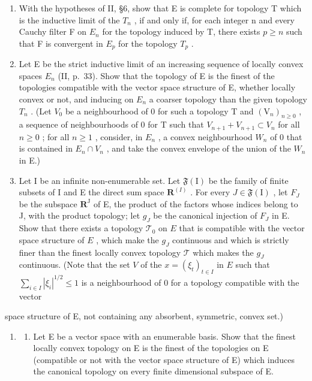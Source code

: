 \begin{enumerate}
\def\labelenumi{\arabic{enumi})}
\setcounter{enumi}{12}
\item
  With the hypotheses of II, §6, show that E is complete for topology T which is the inductive limit of the \(T_{n}\) , if and only if, for each integer n and every Cauchy filter F on \(E_{n}\) for the topology induced by T, there exists \(p \geqslant n\) such that F is convergent in \(E_{p}\) for the topology \(T_{p}\) .
\item
  Let E be the strict inductive limit of an increasing sequence of locally convex spaces \(E_{n}\) (II, p.~33). Show that the topology of E is the finest of the topologies compatible with the vector space structure of E, whether locally convex or not, and inducing on \(E_{n}\) a coarser topology than the given topology \(T_{n}\) . (Let \(V_{0}\) be a neighbourhood of 0 for such a topology T and \((\mathrm{V}_{n})_{n\geqslant0}\) , a sequence of neighbourhoods of 0 for T such that \(V_{n+1} + V_{n+1} \subset V_{n}\) for all \(n \geqslant 0\) ; for all \(n \geqslant 1\) , consider, in \(E_{n}\) , a convex neighbourhood \(W_{n}\) of 0 that is contained in \(E_{n} \cap V_{n}\) , and take the convex envelope of the union of the \(W_{n}\) in E.)
\item
  Let I be an infinite non-enumerable set. Let \(\mathfrak{F}(\mathrm{I})\) be the family of finite subsets of I and E the direct sum space \(\mathbf{R}^{(I)}\) . For every \(J \in \mathfrak{F}(\mathrm{I})\) , let \(F_{J}\) be the subspace \(\mathbf{R}^{\mathrm{J}}\) of E, the product of the factors whose indices belong to J, with the product topology; let \(g_{J}\) be the canonical injection of \(F_{J}\) in E. Show that there exists a topology \(\mathcal{T}_0\) on \(E\) that is compatible with the vector space structure of \(E\) , which make the \(g_{J}\) continuous and which is strictly finer than the finest locally convex topology \(\mathcal{T}\) which makes the \(g_{J}\) continuous. (Note that the set \(V\) of the \(x = (\xi_{t})_{t\in I}\) in \(E\) such that \(\sum_{i\in I}|\xi_i|^{1 / 2}\leqslant 1\) is a neighbourhood of 0 for a topology compatible with the vector
\end{enumerate}

space structure of E, not containing any absorbent, symmetric, convex set.)

\begin{enumerate}
\def\labelenumi{\arabic{enumi})}
\setcounter{enumi}{15}
\tightlist
\item
  \begin{enumerate}
  \def\labelenumii{\alph{enumii})}
  \tightlist
  \item
    Let E be a vector space with an enumerable basis. Show that the finest locally convex topology on E is the finest of the topologies on E (compatible or not with the vector space structure of E) which induces the canonical topology on every finite dimensional subspace of E.
  \end{enumerate}
\end{enumerate}


